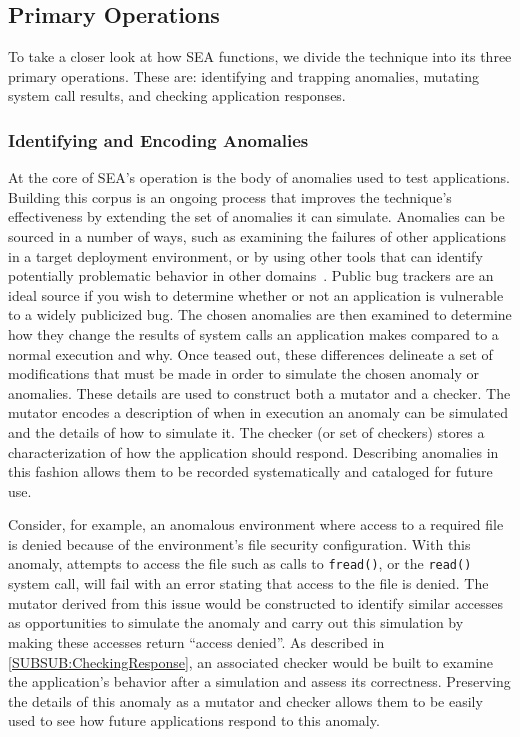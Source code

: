 \subsection{Primary Operations}
\label{SEC:PrimaryOperations}

To take a closer look at how SEA functions,
we divide the technique
into its three primary operations.
These are:
identifying and trapping anomalies,
mutating system call results,
and checking application responses.

\subsubsection{Identifying and Encoding Anomalies}
\label{SUBSUB:IdentifyingAndEncoding}
At the core of SEA's operation is the body of anomalies
used to test applications.
Building this corpus is an ongoing process that improves the technique's
effectiveness by extending the set of anomalies it can simulate.
Anomalies can be sourced
in a number of ways,
such as
examining the failures of other applications
in a target deployment environment,
or by using other tools that can identify
potentially problematic behavior in other domains~\cite{Zhuang_NSDI_2014,
rasley2015detecting}.
Public bug trackers are an ideal source
if you wish to determine
whether or not an application
is vulnerable to a widely publicized bug.
The chosen anomalies are then examined
to determine how they change the results
of system calls an application makes
compared to a normal execution and why.
Once teased out,
these differences delineate
a set of modifications
that must be made
in order to simulate the chosen anomaly or anomalies.
These details are used to
construct both a mutator and a checker.
The mutator encodes
a description of when in execution an anomaly can be simulated
and the details of how to simulate it.
The checker
(or set of checkers)
stores a characterization of
how the application should respond.
Describing anomalies in this fashion
allows them to be recorded systematically and cataloged for future use.

Consider,
for example,
an anomalous environment
where access to a required file is denied because of
the environment's file security configuration.
With this anomaly,
attempts to access the file
such as calls to {\tt fread()},
or the {\tt read()} system call,
will fail with an error stating that access to the file is denied.
The mutator derived from this issue would be constructed to
identify similar accesses as opportunities
to simulate the anomaly
and carry out this simulation
by making these
accesses return ``access denied''.
As described in \ref{SUBSUB:CheckingResponse},
an associated checker would be built to
examine the application's behavior after a simulation and assess its
correctness.
Preserving the details of this anomaly
as a mutator and checker
allows them to be
easily used
to see how future applications
respond to this anomaly.

